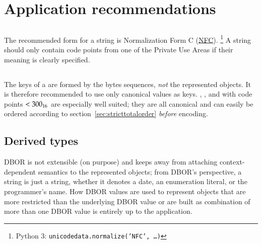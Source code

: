 
\section{Application recommendations}
\label{sec:applicationrecommendations}

\subsection{\DborUtfEightStringValue}

The recommended form for a string is
Normalization Form C (\href{https://www.unicode.org/versions/Unicode13.0.0/ch03.pdf\#G31703}{NFC}).%
\footnote{
    Python 3: \texttt{unicodedata.normalize('NFC', \dots)}
}
A string should only contain code points from one of the Private Use Areas if their meaning is clearly specified.


\subsection{\DborDictionaryValue}

The keys of a \DborDictionaryValue{} are formed by the bytes sequences, \emph{not} the represented objects.
It is therefore recommended to use only canonical values as keys.
\DborIntegerValue{}, \DborByteStringValue{}, and \DborUtfEightStringValue{} with code points $< \mathrm{300}_{16}$
are especially well suited; they are all canonical and can easily be ordered according to
section~\ref{sec:stricttotalorder} \emph{before} encoding.


\subsection{Derived types}

DBOR is not extensible (on purpose) and keeps away from attaching context-dependent semantics to the represented objects;
from DBOR's perspective, a string is just a string, whether it denotes a date, an enumeration literal,
or the programmer's name.
How DBOR values are used to represent objects that
are more restricted than the underlying DBOR value or
are built as combination of more than one DBOR value
is entirely up to the application.

